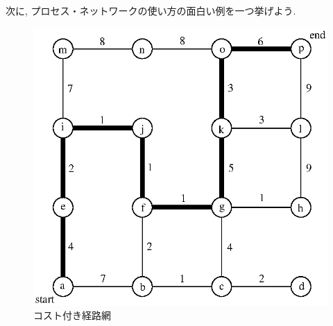 \documentclass[a4,titlepage]{jsreport}
\begin{document}
次に, プロセス・ネットワークの使い方の面白い例を一つ挙げよう.  

\begin{figure}
\begin{center}
\includegraphics{fig/path.eps}
\caption{コスト付き経路網}
\label{path}
\end{center}
\end{figure}
\end{document}
